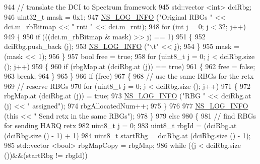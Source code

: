 \begin{DoxyCode}
944           \textcolor{comment}{// translate the DCI to Spectrum framework}
945           std::vector <int> dciRbg;
946           uint32\_t mask = 0x1;
947           \hyperlink{group__logging_gafbd73ee2cf9f26b319f49086d8e860fb}{NS\_LOG\_INFO} (\textcolor{stringliteral}{"Original RBGs "} << dci.m\_rbBitmap << \textcolor{stringliteral}{" rnti "} << dci.m\_rnti);
948           \textcolor{keywordflow}{for} (\textcolor{keywordtype}{int} j = 0; j < 32; j++)
949             \{
950               \textcolor{keywordflow}{if} (((dci.m\_rbBitmap & mask) >> j) == 1)
951                 \{
952                   dciRbg.push\_back (j);
953                   \hyperlink{group__logging_gafbd73ee2cf9f26b319f49086d8e860fb}{NS\_LOG\_INFO} (\textcolor{stringliteral}{"\(\backslash\)t"} << j);
954                 \}
955               mask = (mask << 1);
956             \}
957           \textcolor{keywordtype}{bool} free = \textcolor{keyword}{true};
958           \textcolor{keywordflow}{for} (uint8\_t j = 0; j < dciRbg.size (); j++)
959             \{
960               \textcolor{keywordflow}{if} (rbgMap.at (dciRbg.at (j)) == \textcolor{keyword}{true})
961                 \{
962                   free = \textcolor{keyword}{false};
963                   \textcolor{keywordflow}{break};
964                 \}
965             \}
966           \textcolor{keywordflow}{if} (free)
967             \{
968               \textcolor{comment}{// use the same RBGs for the retx}
969               \textcolor{comment}{// reserve RBGs}
970               \textcolor{keywordflow}{for} (uint8\_t j = 0; j < dciRbg.size (); j++)
971                 \{
972                   rbgMap.at (dciRbg.at (j)) = \textcolor{keyword}{true};
973                   \hyperlink{group__logging_gafbd73ee2cf9f26b319f49086d8e860fb}{NS\_LOG\_INFO} (\textcolor{stringliteral}{"RBG "} << dciRbg.at (j) << \textcolor{stringliteral}{" assigned"});
974                   rbgAllocatedNum++;
975                 \}
976 
977               \hyperlink{group__logging_gafbd73ee2cf9f26b319f49086d8e860fb}{NS\_LOG\_INFO} (\textcolor{keyword}{this} << \textcolor{stringliteral}{" Send retx in the same RBGs"});
978             \}
979           \textcolor{keywordflow}{else}
980             \{
981               \textcolor{comment}{// find RBGs for sending HARQ retx}
982               uint8\_t j = 0;
983               uint8\_t rbgId = (dciRbg.at (dciRbg.size () - 1) + 1) %
984               uint8\_t startRbg = dciRbg.at (dciRbg.size () - 1);
985               std::vector <bool> rbgMapCopy = rbgMap;
986               \textcolor{keywordflow}{while} ((j < dciRbg.size ())&&(startRbg != rbgId))

\end{DoxyCode}

